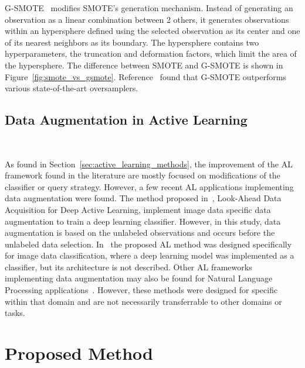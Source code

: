 \documentclass[parskip=full]{scrartcl}
\begin{document}
G-SMOTE~\cite{Douzas2019} modifies SMOTE's generation mechanism. Instead of
generating an observation as a linear combination between 2 others, it
generates observations within an hypersphere defined using the selected
observation as its center and one of its nearest neighbors as its boundary.
The hypersphere contains two hyperparameters, the truncation and deformation
factors, which limit the area of the hypersphere. The difference between SMOTE
and G-SMOTE is shown in Figure~\ref{fig:smote_vs_gsmote}.
Reference~\cite{Douzas2019imbalanced} found that G-SMOTE outperforms various
state-of-the-art oversamplers.

\subsection{Data Augmentation in Active Learning
}~\label{sec:data_augmentation_in_al}

As found in Section~\ref{sec:active_learning_methods}, the improvement of the
AL framework found in the literature are mostly focused on modifications of
the classifier or query strategy. However, a few recent AL applications
implementing data augmentation were found. The method proposed
in~\cite{Kim2021}, Look-Ahead Data Acquisition for Deep Active Learning,
implement image data specific data augmentation to train a deep learning
classifier. However, in this study, data augmentation is based on the
unlabeled observations and occurs before the unlabeled data selection.
In~\cite{Ma2020} the proposed AL method was designed specifically for image
data classification, where a deep learning model was implemented as a
classifier, but its architecture is not described. Other AL frameworks
implementing data augmentation may also be found for Natural Language
Processing applications~\cite{Quteineh2020, Li2021framework}. However, these
methods were designed for specific within that domain and are not necessarily
transferrable to other domains or tasks.

\section{Proposed Method}~\label{sec:proposed_method}
\end{document}
